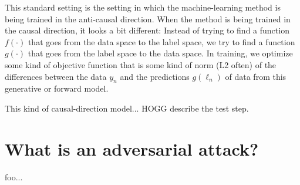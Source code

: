 \documentclass[12pt, letterpaper]{article}
\begin{document}
This standard setting is the setting in which the machine-learning
method is being trained in the anti-causal direction.
When the method is being trained in the causal direction, it looks a
bit different:
Instead of trying to find a function $f(\cdot)$ that goes from the
data space to the label space, we try to find a function $g(\cdot)$
that goes from the label space to the data space.
In training, we optimize some kind of objective function
that is some kind of norm (L2 often) of the differences
between the data $y_n$ and the predictions $g(\ell_n)$ of data
from this generative or forward model.

This kind of causal-direction model... HOGG describe the test step.

\section{What is an adversarial attack?}

foo...
\end{document}
